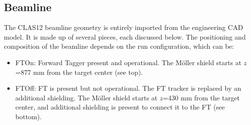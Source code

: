 \subsection{Beamline} \label{sec:beamline}
The CLAS12 beamline geometry is entirely imported from the engineering CAD model.
It is made up of several pieces, each discussed below. The positioning and composition of the beamline
depends on the run configuration, which can be:

\begin{itemize}
	\item FTOn: Forward Tagger present and operational. The M\"oller shield starts at $z$=877 mm from the target center (see  top).
	\item FTOff: FT is present but not operational. The FT tracker is replaced by an additional shielding.
                 The M\"oller shield starts at $z$=430 mm from the target center, and additional shielding
                 is present to connect it to the FT (see  bottom).
\end{itemize}



